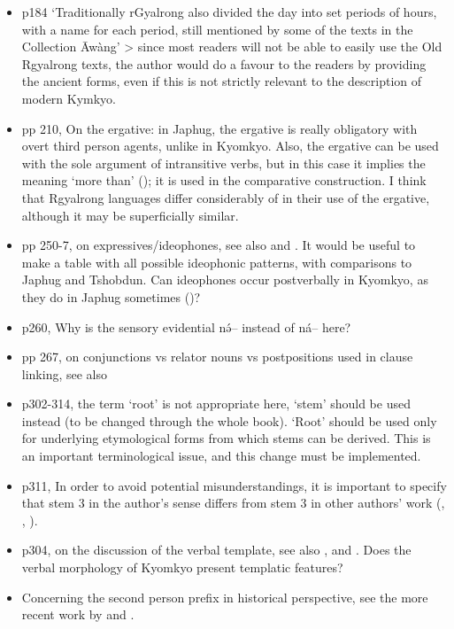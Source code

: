 \documentclass[oldfontcommands,oneside,a4paper,11pt]{article}
\newcommand{\ipa}[1]{{\phon \mbox{#1}}} %
\begin{document}
\begin{itemize}
\item p184 `Traditionally rGyalrong also divided the day into set periods of hours, with a name for each period, still mentioned by some of the texts in the Collection Āwàng' > since most readers will not be able to easily use the Old Rgyalrong texts, the author would do a favour to the readers by providing the ancient forms, even if this is not strictly relevant to the description of modern Kymkyo.
\item pp 210, On the ergative: in Japhug, the ergative is really obligatory with overt third person agents, unlike in Kyomkyo. Also, the ergative can be used with the sole argument of intransitive verbs, but in this case it implies the meaning `more than' (\citet[202]{jacques12demotion}); it is used in the comparative construction. I think that Rgyalrong languages differ considerably of in their use of the ergative, although it may be superficially similar.
\item pp 250-7, on expressives/ideophones, see also \citet{japhug14ideophones} and \citet{jackson14morpho}. It would be useful to make a table with all possible ideophonic patterns, with comparisons to Japhug and Tshobdun. Can ideophones occur postverbally in Kyomkyo, as they do in Japhug sometimes (\citealt[275]{japhug14ideophones})?
\item p260, Why is the sensory evidential \ipa{nə́--} instead of \ipa{ná--} here?
\item pp 267, on conjunctions vs relator nouns vs postpositions used in clause linking, see also \citet{jacques14linking}
\item p302-314, the term `root' is not appropriate here, `stem' should be used instead (to be changed through the whole book). `Root' should be used only for underlying etymological forms from which stems can be derived. This is an important terminological issue, and this change must be implemented.
\item p311, In order to avoid potential misunderstandings, it is important to specify that stem 3 in the author's sense differs from stem 3 in other authors' work (\citealt{jackson00sidaba}, \citealt{jacques04these}, \citealt{gongxun14agreement}).
\item p304, on the discussion of the verbal template, see also \citet[197-199]{jacques13harmonization}, \citet[12]{jacques14antipassive} and \citet{lai13affixale}. Does the verbal morphology of Kyomkyo present templatic features?
\item Concerning the second person prefix in historical perspective, see the more recent work by \citet{jacques12agreement} and \citet{delancey14second}.

\end{itemize}
\end{document}
